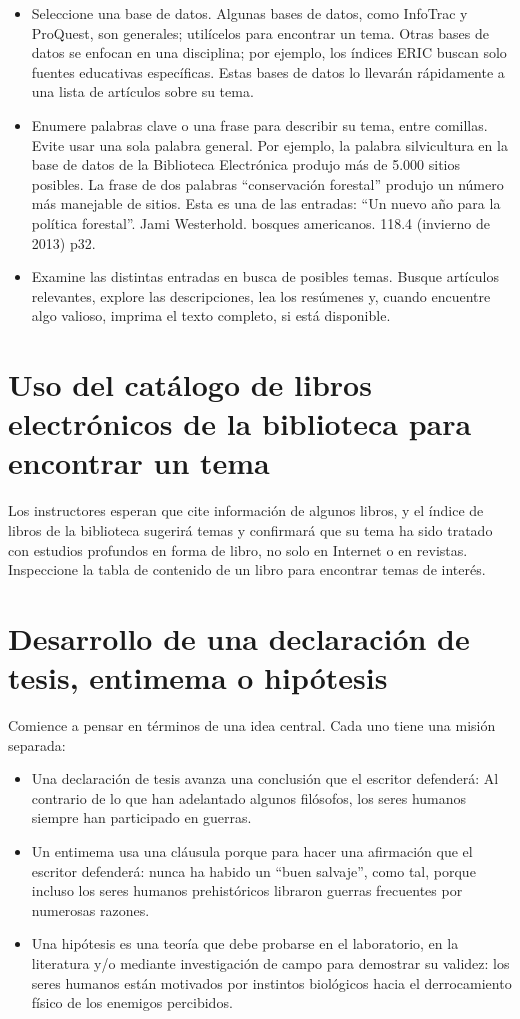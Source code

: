 \begin{itemize}
    \item Seleccione una base de datos. Algunas bases de datos, como InfoTrac y ProQuest, son generales; utilícelos para encontrar un tema. Otras bases de datos se enfocan en una disciplina; por ejemplo, los índices ERIC buscan solo fuentes educativas específicas. Estas bases de datos lo llevarán rápidamente a una lista de artículos sobre su tema. 
    \item Enumere palabras clave o una frase para describir su tema, entre comillas. Evite usar una sola palabra general. Por ejemplo, la palabra silvicultura en la base de datos de la Biblioteca Electrónica produjo más de 5.000 sitios posibles. La frase de dos palabras “conservación forestal” produjo un número más manejable de sitios. Esta es una de las entradas: “Un nuevo año para la política forestal”. Jami Westerhold. bosques americanos. 118.4 (invierno de 2013) p32. 
    \item Examine las distintas entradas en busca de posibles temas. Busque artículos relevantes, explore las descripciones, lea los resúmenes y, cuando encuentre algo valioso, imprima el texto completo, si está disponible.
\end{itemize}

\section{Uso del catálogo de libros electrónicos de la biblioteca para encontrar un tema}
Los instructores esperan que cite información de algunos libros, y el índice de libros de la biblioteca sugerirá temas y confirmará que su tema ha sido tratado con estudios profundos en forma de libro, no solo en Internet o en revistas.\\
Inspeccione la tabla de contenido de un libro para encontrar temas de interés.

\section{Desarrollo de una declaración de tesis, entimema o hipótesis}
Comience a pensar en términos de una idea central. Cada uno tiene una misión separada: 
\begin{itemize}
    \item Una declaración de tesis avanza una conclusión que el escritor defenderá: Al contrario de lo que han adelantado algunos filósofos, los seres humanos siempre han participado en guerras. 
    \item Un entimema usa una cláusula porque para hacer una afirmación que el escritor defenderá: nunca ha habido un “buen salvaje”, como tal, porque incluso los seres humanos prehistóricos libraron guerras frecuentes por numerosas razones. 
    \item Una hipótesis es una teoría que debe probarse en el laboratorio, en la literatura y/o mediante investigación de campo para demostrar su validez: los seres humanos están motivados por instintos biológicos hacia el derrocamiento físico de los enemigos percibidos.
\end{itemize}

